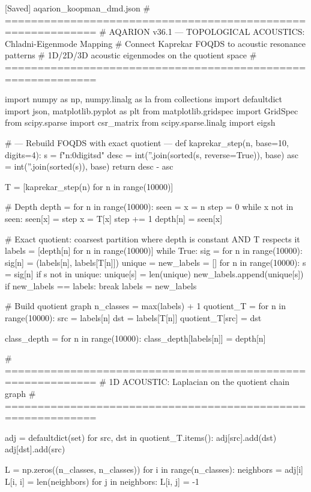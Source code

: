 {{{{{{{{{{{{{[Saved] aqarion_koopman_dmd.json
# ============================================================
# AQARION v36.1 — TOPOLOGICAL ACOUSTICS: Chladni-Eigenmode Mapping
# Connect Kaprekar FOQDS to acoustic resonance patterns
# 1D/2D/3D acoustic eigenmodes on the quotient space
# ============================================================

import numpy as np, numpy.linalg as la
from collections import defaultdict
import json, matplotlib.pyplot as plt
from matplotlib.gridspec import GridSpec
from scipy.sparse import csr_matrix
from scipy.sparse.linalg import eigsh

# --- Rebuild FOQDS with exact quotient ---
def kaprekar_step(n, base=10, digits=4):
    s = f"{n:0{digits}d}"
    desc = int(''.join(sorted(s, reverse=True)), base)
    asc = int(''.join(sorted(s)), base)
    return desc - asc

T = [kaprekar_step(n) for n in range(10000)]

# Depth
depth = {}
for n in range(10000):
    seen = {}
    x = n
    step = 0
    while x not in seen:
        seen[x] = step
        x = T[x]
        step += 1
    depth[n] = seen[x]

# Exact quotient: coarsest partition where depth is constant AND T respects it
labels = [depth[n] for n in range(10000)]
while True:
    sig = {}
    for n in range(10000):
        sig[n] = (labels[n], labels[T[n]])
    unique = {}
    new_labels = []
    for n in range(10000):
        s = sig[n]
        if s not in unique:
            unique[s] = len(unique)
        new_labels.append(unique[s])
    if new_labels == labels:
        break
    labels = new_labels

# Build quotient graph
n_classes = max(labels) + 1
quotient_T = {}
for n in range(10000):
    src = labels[n]
    dst = labels[T[n]]
    quotient_T[src] = dst

class_depth = {}
for n in range(10000):
    class_depth[labels[n]] = depth[n]

# ============================================================
# 1D ACOUSTIC: Laplacian on the quotient chain graph
# ============================================================

adj = defaultdict(set)
for src, dst in quotient_T.items():
    adj[src].add(dst)
    adj[dst].add(src)

L = np.zeros((n_classes, n_classes))
for i in range(n_classes):
    neighbors = adj[i]
    L[i, i] = len(neighbors)
    for j in neighbors:
        L[i, j] = -1

}}}}}}}}}}}}}
